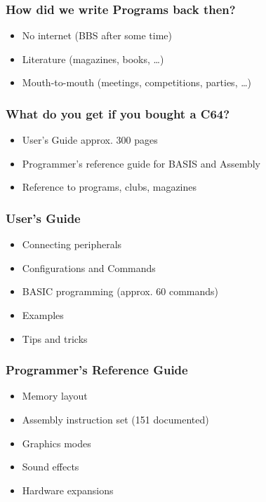 \documentclass[aspectratio=43]{uva-inf-presentation}
\begin{document}

\begin{frame}
\frametitle{How did we write Programs back then?}

\begin{itemize}
\item No internet (BBS after some time)
\item Literature (magazines, books, \dots)
\item Mouth-to-mouth (meetings, competitions, parties, \dots)
\end{itemize}

\end{frame}


\begin{frame}
\frametitle{What do you get if you bought a C64?}

\begin{itemize}
\item User's Guide approx. 300 pages
\item Programmer's reference guide for BASIS and Assembly
\item Reference to programs, clubs, magazines
\end{itemize}

\end{frame}


\begin{frame}
\frametitle{User's Guide}

\begin{itemize}
\item Connecting peripherals
\item Configurations and Commands
\item BASIC programming (approx. 60 commands)
\item Examples
\item Tips and tricks
\end{itemize}

\end{frame}


\begin{frame}
\frametitle{Programmer's Reference Guide}

\begin{itemize}
\item Memory layout
\item Assembly instruction set (151 documented)
\item Graphics modes
\item Sound effects
\item Hardware expansions
\end{itemize}

\end{frame}
\end{document}

